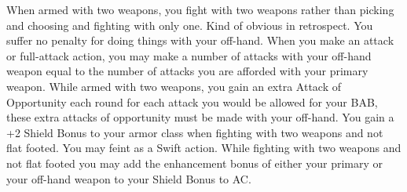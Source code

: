{When armed with two weapons, you fight with two weapons rather than picking and choosing and fighting with only one. Kind of obvious in retrospect.}
{You suffer no penalty for doing things with your off-hand. When you make an attack or full-attack action, you may make a number of attacks with your off-hand weapon equal to the number of attacks you are afforded with your primary weapon.}
{While armed with two weapons, you gain an extra Attack of Opportunity each round for each attack you would be allowed for your BAB, these extra attacks of opportunity must be made with your off-hand.}
{You gain a +2 Shield Bonus to your armor class when fighting with two weapons and not flat footed.}
{You may feint as a Swift action.}
{While fighting with two weapons and not flat footed you may add the enhancement bonus of either your primary or your off-hand weapon to your Shield Bonus to AC.}